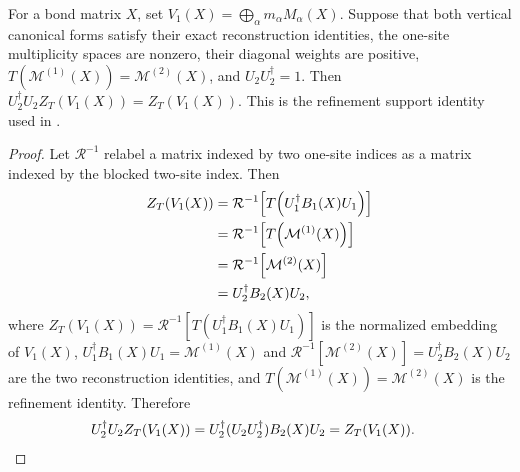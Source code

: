 \begin{lemma}
    \label{lem:mpdo_vertical_sector_t_image_preservation}
    \leanok
    For a bond matrix $X$, set
    $V_1(X)=\bigoplus_\alpha m_\alpha M_\alpha(X)$.
    Suppose that both vertical canonical forms satisfy their exact
    reconstruction identities, the one-site multiplicity spaces are nonzero,
    their diagonal weights are positive,
    $T(\mathcal M^{(1)}(X))=\mathcal M^{(2)}(X)$, and
    $U_2U_2^\dagger=1$. Then
    $U_2^\dagger U_2 Z_T(V_1(X))=Z_T(V_1(X))$.
    This is the refinement support identity used in
    \cite[Appendix~C.4, lines~1955--1980]{Cirac2016MPDO_arXiv}.
\end{lemma}

\begin{proof}\leanok
    Let $\mathcal R^{-1}$ relabel a matrix indexed by two one-site indices as
    a matrix indexed by the blocked two-site index. Then
    \begin{align}
        Z_T(V_1(X))
         & =\mathcal R^{-1}\!\left[T\!\left(U_1^\dagger B_1(X)U_1\right)\right] \notag \\
         & =\mathcal R^{-1}\!\left[T\!\left(\mathcal M^{(1)}(X)\right)\right] \notag   \\
         & =\mathcal R^{-1}\!\left[\mathcal M^{(2)}(X)\right] \notag                   \\
         & =U_2^\dagger B_2(X)U_2,
        \notag
    \end{align}
    where
    $Z_T(V_1(X))=\mathcal R^{-1}[T(U_1^\dagger B_1(X)U_1)]$ is the normalized
    embedding of $V_1(X)$,
    $U_1^\dagger B_1(X) U_1 = \mathcal M^{(1)}(X)$ and
    $\mathcal R^{-1}[\mathcal M^{(2)}(X)] = U_2^\dagger B_2(X) U_2$ are the two reconstruction identities,
    and $T(\mathcal M^{(1)}(X)) = \mathcal M^{(2)}(X)$ is the refinement identity. Therefore
    \begin{align}
        U_2^\dagger U_2Z_T(V_1(X))
         & =U_2^\dagger(U_2U_2^\dagger)B_2(X)U_2
        =Z_T(V_1(X)).
        \notag
    \end{align}
\end{proof}

